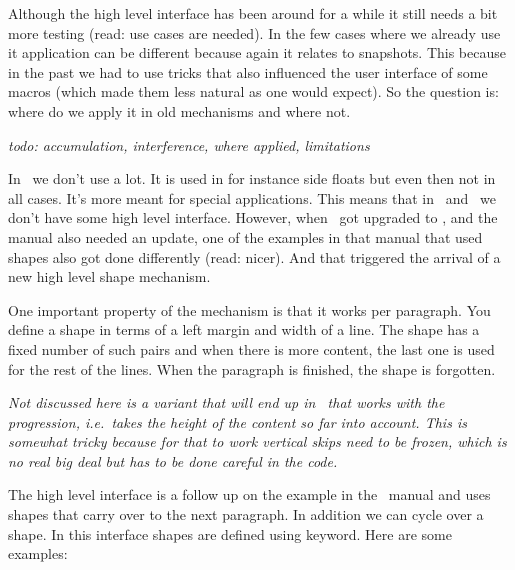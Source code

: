 Although the high level interface has been around for a while it still needs a
bit more testing (read: use cases are needed). In the few cases where we already
use it application can be different because again it relates to snapshots. This
because in the past we had to use tricks that also influenced the user interface
of some macros (which made them less natural as one would expect). So the
question is: where do we apply it in old mechanisms and where not.

{\em todo: accumulation, interference, where applied, limitations}


\stopsection

\startsection[title=Shapes]

In \CONTEXT\ we don't use \type {\parshape} a lot. It is used in for instance
side floats but even then not in all cases. It's more meant for special
applications. This means that in \MKII\ and \MKIV\ we don't have some high level
interface. However, when \METAFUN\ got upgraded to \LUAMETAFUN, and the manual
also needed an update, one of the examples in that manual that used shapes also
got done differently (read: nicer). And that triggered the arrival of a new high
level shape mechanism.

One important property of the \type {\parshape} mechanism is that it works per
paragraph. You define a shape in terms of a left margin and width of a line. The
shape has a fixed number of such pairs and when there is more content, the last one
is used for the rest of the lines. When the paragraph is finished, the shape is
forgotten.

{\em Not discussed here is a variant that will end up in \LUAMETATEX\ that works
with the progression, i.e.\ takes the height of the content so far into account.
This is somewhat tricky because for that to work vertical skips need to be
frozen, which is no real big deal but has to be done careful in the code.}

The high level interface is a follow up on the example in the \METAFUN\ manual and
uses shapes that carry over to the next paragraph. In addition we can cycle over
a shape. In this interface shapes are defined using keyword. Here are some
examples:

